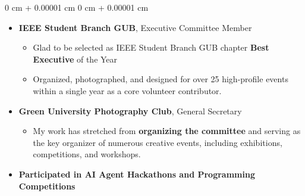 \documentclass[10pt, letterpaper]{article}
\newenvironment{highlightsforbulletentries}{
    \begin{itemize}[
        topsep=0.10 cm,
        parsep=0.10 cm,
        partopsep=0pt,
        itemsep=0pt,
        leftmargin=10pt
    ]
}{
    \end{itemize}
} %
\newenvironment{onecolentry}{
    \begin{adjustwidth}{
        0 cm + 0.00001 cm
    }{
        0 cm + 0.00001 cm
    }
}{
    \end{adjustwidth}
} %
\begin{document}
    \begin{onecolentry}
        \begin{highlightsforbulletentries}


        \item \textbf{IEEE Student Branch GUB}, Executive Committee Member
        \begin{highlightsforbulletentries}
            \item Glad to be selected as IEEE Student Branch GUB chapter \textbf{Best Executive} of the Year
            \item Organized, photographed, and designed for over 25 high-profile events within a single year as a core volunteer contributor.
        \end{highlightsforbulletentries}

        \item \textbf{Green University Photography Club}, General Secretary
        \begin{highlightsforbulletentries}
            \item My work has stretched from \textbf{organizing the committee} and serving as the key organizer of numerous creative events, including exhibitions, competitions, and workshops.
        \end{highlightsforbulletentries}

        \item \textbf{Participated in AI Agent Hackathons and Programming Competitions}
        
        \end{highlightsforbulletentries}
    \end{onecolentry}


    
       
        






        
\end{document}
